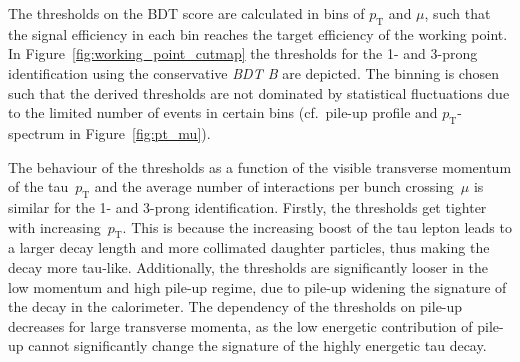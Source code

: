 The thresholds on the BDT score are calculated in bins of $p_\text{T}$ and
$\mu$, such that the signal efficiency in each bin reaches the target efficiency
of the working point. In Figure~\ref{fig:working_point_cutmap} the thresholds
for the 1- and 3-prong identification using the conservative \emph{BDT B} are
depicted. The binning is chosen such that the derived thresholds are not
dominated by statistical fluctuations due to the limited number of events in
certain bins (cf.\ pile-up profile and $p_\text{T}$-spectrum in
Figure~\ref{fig:pt_mu}).

The behaviour of the thresholds as a function of the visible transverse momentum
of the tau~$p_\text{T}$ and the average number of interactions per bunch
crossing~$\mu$ is similar for the 1- and 3-prong identification. Firstly, the
thresholds get tighter with increasing~$p_\text{T}$. This is because the
increasing boost of the tau lepton leads to a larger decay length and more
collimated daughter particles, thus making the decay more tau-like.
Additionally, the thresholds are significantly looser in the low momentum and
high pile-up regime, due to pile-up widening the signature of the decay in the
calorimeter. The dependency of the thresholds on pile-up decreases for large
transverse momenta, as the low energetic contribution of pile-up cannot
significantly change the signature of the highly energetic tau decay.

